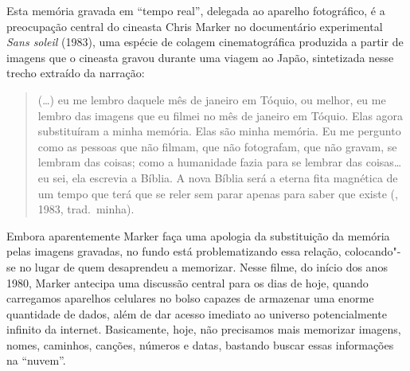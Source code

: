 Esta memória gravada em ``tempo real'', delegada ao aparelho fotográfico,
é a preocupação central do cineasta Chris Marker no documentário
experimental \emph{Sans soleil} (1983), uma espécie de colagem
cinematográfica produzida a partir de imagens que o cineasta gravou
durante uma viagem ao Japão, sintetizada nesse trecho extraído da
narração:

\begin{quote}
(\ldots{}) eu me lembro daquele mês de janeiro em Tóquio, ou melhor, eu me
lembro das imagens que eu filmei no mês de janeiro em Tóquio. Elas agora
substituíram a minha memória. Elas são minha memória. Eu me pergunto
como as pessoas que não filmam, que não fotografam, que não gravam, se
lembram das coisas; como a humanidade fazia para se lembrar das
coisas\ldots{} eu sei, ela escrevia a Bíblia. A nova Bíblia será a eterna fita
magnética de um tempo que terá que se reler sem parar apenas para saber
que existe (, 1983, trad.~minha).
\end{quote}

Embora aparentemente Marker faça uma apologia da substituição da memória
pelas imagens gravadas, no fundo está problematizando essa relação,
colocando"-se no lugar de quem desaprendeu a memorizar. Nesse filme, do
início dos anos 1980, Marker antecipa uma discussão central para os dias
de hoje, quando carregamos aparelhos celulares no bolso capazes de
armazenar uma enorme quantidade de dados, além de dar acesso imediato ao
universo potencialmente infinito da internet. Basicamente, hoje, não
precisamos mais memorizar imagens, nomes, caminhos, canções, números e
datas, bastando buscar essas informações na ``nuvem''.

